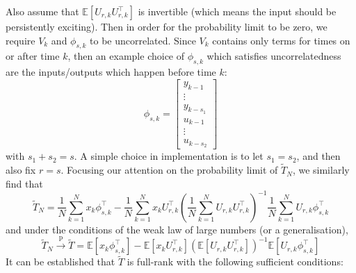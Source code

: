 \documentclass[11pt]{report} %
\begin{document}
Also assume that $\mathbb{E}\left[U_{r, k}U_{r, k}^{\top}\right]$ is invertible (which means the input should be persistently exciting). Then in order for the probability limit to be zero, we require $V_{k}$ and $\phi_{s, k}$ to be uncorrelated. Since $V_{k}$ contains only terms for times on or after time $k$, then an example choice of $\phi_{s, k}$ which satisfies uncorrelatedness are the inputs/outputs which happen before time $k$:
\begin{equation}
\phi_{s, k} = \begin{bmatrix}
y_{k - 1} \\ \vdots \\ y_{k - s_{1}} \\ u_{k - 1} \\ \vdots \\ u_{k - s_{2}}
\end{bmatrix}
\end{equation}
with $s_{1} + s_{2} = s$. A simple choice in implementation is to let $s_{1} = s_{2}$, and then also fix $r = s$. Focusing our attention on the probability limit of $\widetilde{T}_{N}$, we similarly find that
\begin{equation}
\widetilde{T}_{N} = \dfrac{1}{N}\sum_{k = 1}^{N}x_{k}\phi_{s, k}^{\top} - \dfrac{1}{N}\sum_{k = 1}^{N}x_{k}U_{r, k}^{\top}\left(\dfrac{1}{N}\sum_{k = 1}^{N}U_{r, k}U_{r, k}^{\top}\right)^{-1}\dfrac{1}{N}\sum_{k = 1}^{N}U_{r, k}\phi_{s, k}^{\top}
\end{equation}
and under the conditions of the weak law of large numbers (or a generalisation),
\begin{equation}
\widetilde{T}_{N} \overset{\mathrm{p}}{\to} \widetilde{T} = \mathbb{E}\left[x_{k}\phi_{s, k}^{\top}\right] - \mathbb{E}\left[x_{k}U_{r, k}^{\top}\right]\left(\mathbb{E}\left[U_{r, k}U_{r, k}^{\top}\right]\right)^{-1}\mathbb{E}\left[U_{r, k}\phi_{s, k}^{\top}\right]
\end{equation}
It can be established that $\widetilde{T}$ is full-rank with the following sufficient conditions:
\end{document}
